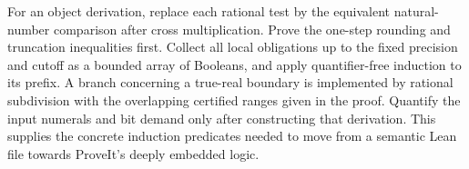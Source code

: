 For an object derivation, replace each rational test by the equivalent natural-number comparison after cross multiplication. Prove the one-step rounding and truncation inequalities first. Collect all local obligations up to the fixed precision and cutoff as a bounded array of Booleans, and apply quantifier-free induction to its prefix. A branch concerning a true-real boundary is implemented by rational subdivision with the overlapping certified ranges given in the proof. Quantify the input numerals and bit demand only after constructing that derivation. This supplies the concrete induction predicates needed to move from a semantic Lean file towards ProveIt's deeply embedded logic.
